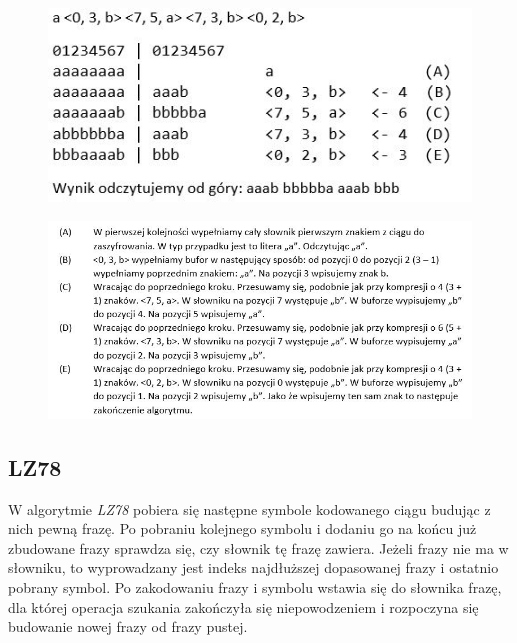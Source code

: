 \documentclass{article}
\begin{document}
\begin{figure}[h!]
\centering
\includegraphics{img/lz77_3.JPG}
\end{figure}

\newpage

\begin{figure}[h!]
\centering
\includegraphics{img/lz77_4.JPG}
\end{figure}

\subsection{LZ78}
W algorytmie \textit{LZ78} pobiera się następne symbole kodowanego ciągu budując z nich pewną frazę. Po pobraniu kolejnego symbolu i dodaniu  go  na końcu już zbudowane  frazy sprawdza się, czy słownik tę frazę zawiera. Jeżeli frazy nie ma w słowniku, to wyprowadzany jest indeks najdłuższej dopasowanej frazy i  ostatnio  pobrany  symbol.  Po  zakodowaniu frazy i symbolu wstawia się do słownika frazę, dla której  operacja szukania zakończyła się niepowodzeniem i rozpoczyna się budowanie nowej frazy od frazy pustej. 
\end{document}

